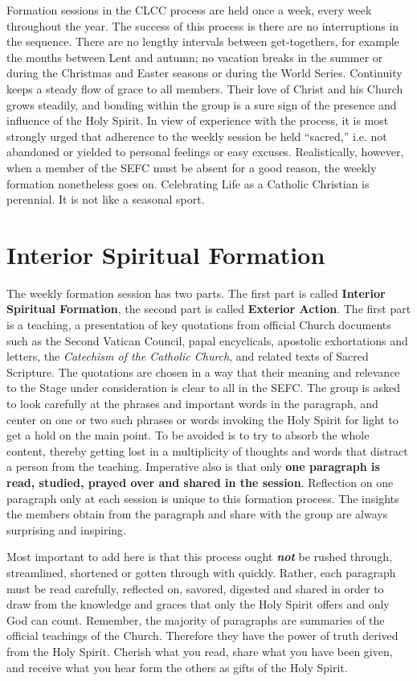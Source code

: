 \documentclass{article}
\begin{document}
Formation sessions in the CLCC process are held once a week, every week
throughout the year. The success of this process is there are no interruptions
in the sequence. There are no lengthy intervals between get-togethers, for
example the months between Lent and autumn; no vacation breaks in the summer or
during the Christmas and Easter seasons or during the World Series. Continuity
keeps a steady flow of grace to all members. Their love of Christ and his Church
grows steadily, and bonding within the group is a sure sign of the presence and
influence of the Holy Spirit. In view of experience with the process, it is most
strongly urged that adherence to the weekly session be held ``sacred,'' i.e. not
abandoned or yielded to personal feelings or easy excuses. Realistically,
however, when a member of the SEFC must be absent for a good reason, the weekly
formation nonetheless goes on. Celebrating Life as a Catholic Christian is
perennial. It is not like a seasonal sport.

\section{Interior Spiritual Formation}

The weekly formation session has two parts. The first part is called
\textbf{Interior Spiritual Formation}, the second part is called
\textbf{Exterior Action}. The first part is a teaching, a presentation of key
quotations from official Church documents such as the Second Vatican Council,
papal encyclicals, apostolic exhortations and letters, the \emph{Catechism of
the Catholic Church}, and related texts of Sacred Scripture. The quotations are
chosen in a way that their meaning and relevance to the Stage under
consideration is clear to all in the SEFC. The group is asked to look carefully
at the phrases and important words in the paragraph, and center on one or two
such phrases or words invoking the Holy Spirit for light to get a hold on the
main point. To be avoided is to try to absorb the whole content, thereby getting
lost in a multiplicity of thoughts and words that distract a person from the
teaching. Imperative also is that only \textbf{one paragraph is read, studied,
prayed over and shared in the session}. Reflection on one paragraph only at each
session is unique to this formation process. The insights the members obtain
from the paragraph and share with the group are always surprising and inspiring.

Most important to add here is that this process ought \textbf{\emph{not}} be
rushed through, streamlined, shortened or gotten through with quickly. Rather,
each paragraph must be read carefully, reflected on, savored, digested and
shared in order to draw from the knowledge and graces that only the Holy Spirit
offers and only God can count. Remember, the majority of paragraphs are
summaries of the official teachings of the Church. Therefore they have the power
of truth derived from the Holy Spirit. Cherish what you read, share what you
have been given, and receive what you hear form the others as gifts of the Holy
Spirit.
\end{document}
